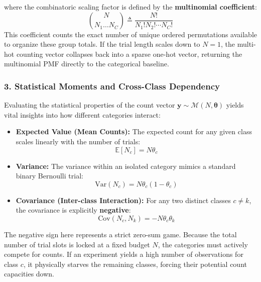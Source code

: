 \documentclass{article}
\begin{document}
\noindent where the combinatoric scaling factor is defined by the \textbf{multinomial coefficient}:
\begin{equation}
    \binom{N}{N_1 \dots N_C} \triangleq \frac{N!}{N_1! N_2! \cdots N_C!}
\end{equation}
This coefficient counts the exact number of unique ordered permutations available to organize these group totals. If the trial length scales down to $N=1$, the multi-hot counting vector collapses back into a sparse one-hot vector, returning the multinomial PMF directly to the categorical baseline.

\subsubsection*{3. Statistical Moments and Cross-Class Dependency}
Evaluating the statistical properties of the count vector $\bm{y} \sim \mathcal{M}(N, \bm{\theta})$ yields vital insights into how different categories interact:
\begin{itemize}
    \item \textbf{Expected Value (Mean Counts):} The expected count for any given class scales linearly with the number of trials:
    \begin{equation}
        \mathbb{E}[N_c] = N\theta_c
    \end{equation}
    \item \textbf{Variance:} The variance within an isolated category mimics a standard binary Bernoulli trial:
    \begin{equation}
        \text{Var}(N_c) = N\theta_c(1 - \theta_c)
    \end{equation}
    \item \textbf{Covariance (Inter-class Interaction):} For any two distinct classes $c \neq k$, the covariance is explicitly \textbf{negative}:
    \begin{equation}
        \text{Cov}(N_c, N_k) = -N\theta_c\theta_k
    \end{equation}
\end{itemize}

\begin{tcolorbox}[colback=red!5!white, colframe=red!60!black, title=Intuition behind Negative Covariance]
The negative sign here represents a strict zero-sum game. Because the total number of trial slots is locked at a fixed budget $N$, the categories must actively compete for counts. If an experiment yields a high number of observations for class $c$, it physically starves the remaining classes, forcing their potential count capacities down.
\end{tcolorbox}
\end{document}
